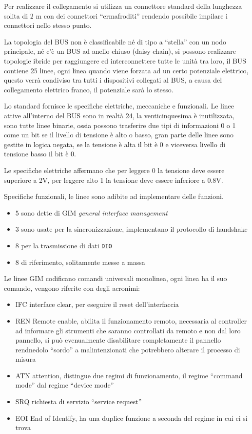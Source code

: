 Per realizzare il collegamento si utilizza un connettore standard della
lunghezza solita di 2 m con dei connettori ``ermafroditi'' rendendo possibile
impilare i connettori nello stesso punto.

La topologia del BUS non è classificabile né di tipo a ``stella'' con un nodo
principale, né c'è un BUS ad anello chiuso (daisy chain), si possono realizzare
topologie ibride per raggiungere ed interconnettere tutte le unità tra loro, il
BUS contiene 25 linee, ogni linea quando viene forzata ad un certo potenziale
elettrico, questo verrà condiviso tra tutti i dispositivi collegati al BUS, a
causa del collegamento elettrico franco, il potenziale sarà lo stesso.

Lo standard fornisce le specifiche elettriche, meccaniche e funzionali.
Le linee attive all'interno del BUS sono in realtà 24, la venticinquesima è
inutilizzata, sono tutte linee binarie, ossia possono trasferire
due tipi di informazioni 0 o 1 come un bit se il livello di tensione è alto o
basso, gran parte delle linee sono gestite in logica negata, se la tensione è
alta il bit è 0 e viceversa livello di tensione basso il bit è 0.

Le specifiche elettriche affermano che per leggere 0 la tensione deve essere
superiore a 2V, per leggere alto 1 la tensione deve essere inferiore a 0.8V.

Specifiche funzionali, le linee sono adibite ad implementare delle funzioni.
\begin{itemize}
\item 5 sono dette di GIM \textit{general interface management}
\item 3 sono usate per la sincronizzazione, implementano il protocollo di
handshake
\item 8 per la trasmissione di dati \verb|DIO|
\item 8 di riferimento, solitamente messe a massa
\end{itemize}

Le linee GIM codificano comandi universali monolinea, ogni linea ha il suo
comando, vengono riferite con degli acronimi:
\begin{itemize}
\item IFC interface clear, per eseguire il reset dell'interfaccia
\item REN Remote enable, abilita il funzionamento remoto, necessaria al
controller ad informare gli strumenti che saranno controllati da remoto e non
dal loro pannello, si può evenualmente disabilitare completamente il pannello
rendnedolo ``sordo'' a malintenzionati che potrebbero alterare il processo di
misura
\item ATN attention, distingue due regimi di funzionamento, il regime ``command
mode'' dal regime ``device mode''
\item SRQ richiesta di servizio ``service request''
\item EOI End of Identify, ha una duplice funzione a seconda del regime in cui
ci si trova
\end{itemize}

